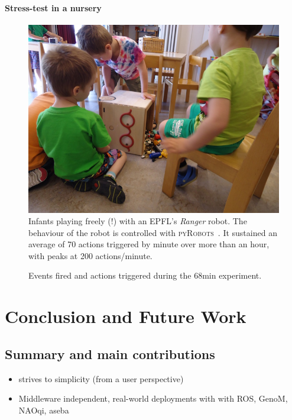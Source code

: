 \documentclass[a4paper, 10pt, conference]{ieeeconf}      %
\newcommand{\pyRobots}{\textsc{pyRobots}\ }
\begin{document}
\paragraph{Stress-test in a nursery}

\begin{figure}
        \centering
        \includegraphics[width=0.9\columnwidth]{ranger-side}
        \caption{Infants playing freely (!) with an EPFL's \emph{Ranger} robot.
        The behaviour of the robot is controlled with \pyRobots. It sustained an
        average of 70 actions triggered by minute over more than an hour,
        with peaks at 200 actions/minute.}
        \label{expe-nursery}
\end{figure}

\begin{figure}
    \resizebox{\columnwidth}{!}{}
    \caption{Events fired and actions triggered during the 68min experiment.}
\end{figure}

\section{Conclusion and Future Work}

\subsection{Summary and main contributions}

\begin{itemize}
    \item strives to simplicity (from a user perspective)
    \item Middleware independent, real-world deployments with with ROS, GenoM, NAOqi, aseba
\end{itemize}
\end{document}
